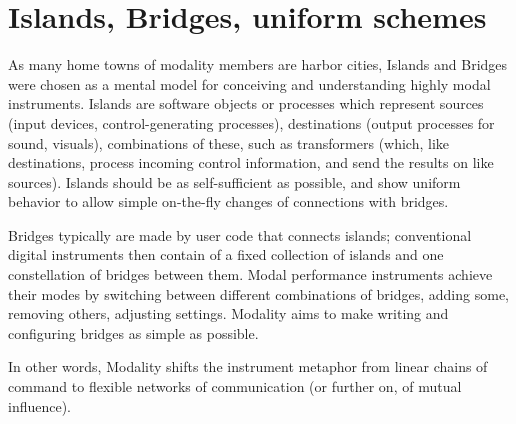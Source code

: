 \documentclass{article}
\begin{document}
\begin{description}
\end{description}


\section{Islands, Bridges, uniform schemes}
\label{sec:islands_and_bridges_uniform_protocols}
As many home towns of modality members are harbor cities, Islands and Bridges were chosen as a mental model for conceiving and understanding highly modal instruments.
Islands are software objects or processes which represent sources (input devices, control-generating processes), destinations (output processes for sound, visuals), combinations of these, such as transformers (which, like destinations, process incoming control information, and send the results on like sources). 
Islands should be as self-sufficient as possible, and show uniform behavior to allow simple on-the-fly changes of connections with bridges. 

Bridges typically are made by user code that connects islands; conventional digital instruments then contain of a fixed collection of islands and one constellation of bridges between them. Modal performance instruments achieve their modes by switching between different combinations of bridges, adding some, removing others, adjusting settings. 
Modality aims to make writing and configuring bridges as simple as possible. 

In other words, Modality shifts the instrument metaphor from linear chains of command to flexible networks of communication (or further on, of mutual influence).
\end{document}
